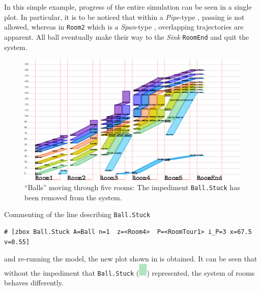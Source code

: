 In this simple example, progress of the entire simulation can be seen in a single plot.
In particular, it is to be noticed that within a \emph{Pipe}-type ,
passing is not allowed, whereas in {\tt Room2} which is a \emph{Span}-type
, overlapping trajectories are apparent.
All ball  eventually make their way to the \emph{Sink}  {\tt RoomEnd} and quit the system.

\begin{figure}[ht]
  \centering
  \includegraphics[angle=0,width=16cm]{50_figs/__Testing_Pipe_Zboxen2.eps}
  \caption{``Balls'' moving through five rooms: The impediment {\tt Ball.Stuck} has been removed from the system.}
  \label{fig:balls2}
\end{figure}
Commenting of the line describing {\tt Ball.Stuck}
\begin{lstlisting}[mathescape]
  # [zbox Ball.Stuck A=Ball n=1  z=<Room4>  P=<RoomTour1> i_P=3 x=67.5 v=0.55]        
\end{lstlisting}
and re-running the model, the new plot shown in  is obtained.
It can be seen that without the impediment that {\tt Ball.Stuck} (\includegraphics[angle=90,width=0.4cm]{50_figs/BallStuckColour.eps})
represented, the system of rooms behaves differently.

